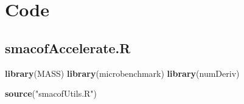 \documentclass[
  12pt,
]{article}
\newenvironment{Shaded}{\begin{snugshade}}{\end{snugshade}}
\newcommand{\FunctionTok}[1]{\textcolor[rgb]{0.13,0.29,0.53}{\textbf{#1}}}
\newcommand{\NormalTok}[1]{#1}
\newcommand{\StringTok}[1]{\textcolor[rgb]{0.31,0.60,0.02}{#1}}
\begin{document}
\section{Code}\label{code}

\subsection{smacofAccelerate.R}\label{smacofaccelerate.r}

\begin{Shaded}
\begin{Highlighting}[]
\FunctionTok{library}\NormalTok{(MASS)}
\FunctionTok{library}\NormalTok{(microbenchmark)}
\FunctionTok{library}\NormalTok{(numDeriv)}

\FunctionTok{source}\NormalTok{(}\StringTok{"smacofUtils.R"}\NormalTok{)}


\end{Highlighting}
\end{Shaded}
\end{document}
